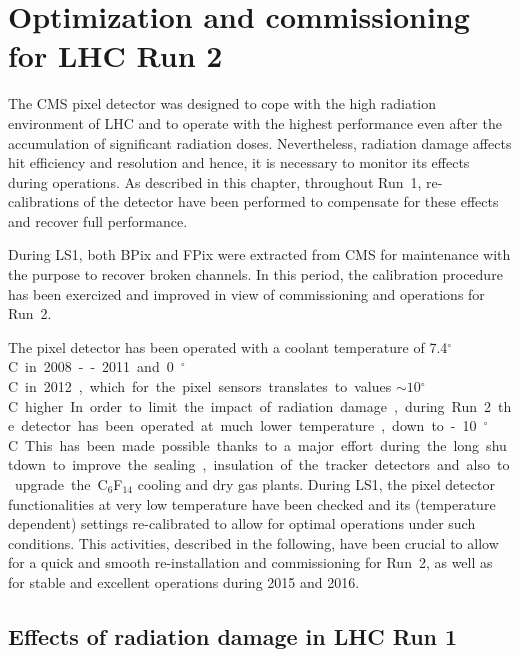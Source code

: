 \chapter{Optimization and commissioning for LHC Run 2}\label{ch:BPixCalib}

The CMS pixel detector was designed to cope with the high radiation environment of LHC and to operate with the highest performance even after the accumulation of significant radiation doses.
Nevertheless, radiation damage affects hit efficiency and resolution and hence, it is necessary to monitor its effects during operations.
As described in this chapter, throughout Run~1, re-calibrations of the detector have been performed to compensate for these effects and recover full performance.

During LS1, both BPix and FPix were extracted from CMS for maintenance with the purpose to recover broken channels.
In this period, the calibration procedure has been exercized and improved in view of commissioning and operations for Run~2.

The pixel detector has been operated with a coolant temperature of 7.4\unit{$^\circ$C} in 2008--2011 and 0\unit{$^\circ$C} in 2012, which for the pixel sensors translates to values $\sim10$\unit{$^\circ$C} higher.
In order to limit the impact of radiation damage, during Run~2 the detector has been operated at much lower temperature, down to -10\unit{$^\circ$C}.
This has been made possible thanks to a major effort during the long shutdown to improve the sealing, insulation of the tracker detectors and also to upgrade the C$_6$F$_{14}$ cooling and dry gas plants.
During LS1, the pixel detector functionalities at very low temperature have been checked and its (temperature dependent) settings re-calibrated to allow for optimal operations under such conditions.
This activities, described in the following, have been crucial to allow for a quick and smooth re-installation and commissioning for Run~2, as well as for stable and excellent operations during 2015 and 2016.

\section{Effects of radiation damage in LHC Run 1}


